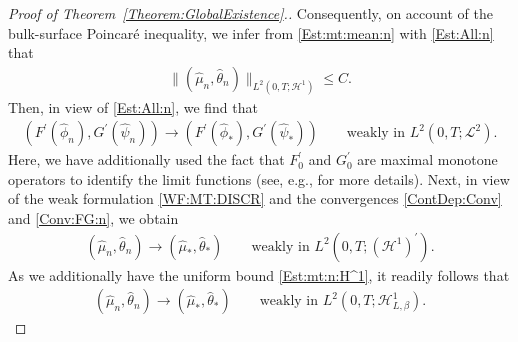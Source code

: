 \documentclass[10pt,reqno]{amsart}
\theoremstyle{remark}
\numberwithin{equation}{section}
\newcommand{\norm}[1]{\| #1 \|}
\newcommand{\wphi}{\widehat{\phi}}
\newcommand{\wpsi}{\widehat{\psi}}
\newcommand{\wmu}{\widehat{\mu}}
\newcommand{\wtheta}{\widehat{\theta}}
\begin{document}
\begin{proof}[Proof of Theorem~\ref{Theorem:GlobalExistence}.]
Consequently, on account of the bulk-surface Poincar\'{e} inequality, we infer from \eqref{Est:mt:mean:n} with \eqref{Est:All:n} that
\begin{align}\label{Est:mt:n:H^1}
    \norm{(\wmu_n,\wtheta_n)}_{L^2(0,T;\mathcal{H}^1)} \leq C.
\end{align}
Then, in view of \eqref{Est:All:n}, we find that
\begin{align}\label{Conv:FG:n}
    (F^\prime(\wphi_n),G^\prime(\wpsi_n)) \rightarrow (F^\prime(\wphi_\ast),G^\prime(\wpsi_\ast)) \qquad\text{weakly in~} L^2(0,T;\mathcal{L}^2).
\end{align}
Here, we have additionally used the fact that $F_0^\prime$ and $G_0^\prime$ are maximal monotone operators to identify the limit functions (see, e.g., \cite{Knopf2025a} for more details). Next, in view of the weak formulation \eqref{WF:MT:DISCR} and the convergences \eqref{ContDep:Conv} and \eqref{Conv:FG:n}, we obtain 
\begin{align*}
    (\wmu_n,\wtheta_n) \rightarrow (\wmu_\ast,\wtheta_\ast) \qquad\text{weakly in~} L^2(0,T;(\mathcal{H}^1)^\prime).
\end{align*}
As we additionally have the uniform bound \eqref{Est:mt:n:H^1}, it readily follows that
\begin{align*}
    (\wmu_n,\wtheta_n) \rightarrow (\wmu_\ast,\wtheta_\ast) \qquad\text{weakly in~} L^2(0,T;\mathcal{H}^1_{L,\beta}).
\end{align*}


\end{proof}
\end{document}
